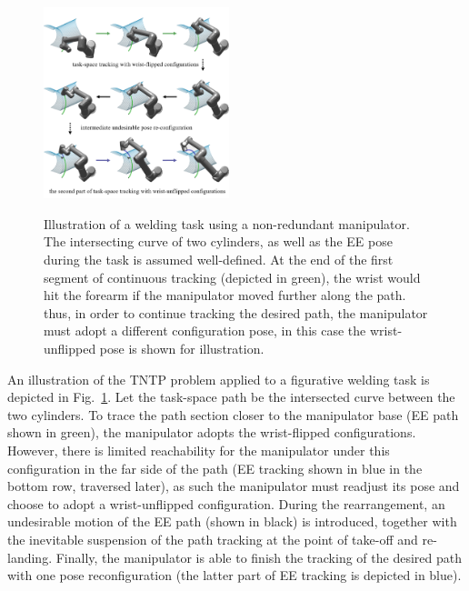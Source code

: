 \documentclass[letterpaper, 10 pt, conference]{ieeeconf}  %
\begin{document}
\begin{figure}[t]
\centering
\includegraphics[width=0.48\textwidth]{figures/fig1/fig1_2}\label{fig:zerosolution}
\caption{Illustration of a welding task using a non-redundant manipulator. The intersecting curve of two cylinders, as well as the EE pose during the task is assumed well-defined. 
At the end of the first segment of continuous tracking (depicted in green), the wrist would hit the forearm if the manipulator moved further along the path. thus, in order to continue tracking the desired path, the manipulator must adopt a different configuration pose, in this case the wrist-unflipped pose is shown for illustration.}
\label{fig:demo1}
\vspace{-0.5cm}
\end{figure}


An illustration of the TNTP problem applied to a figurative welding task is depicted in Fig.~\ref{fig:demo1}. Let the task-space path be the intersected curve between the two cylinders. 
To trace the path section closer to the manipulator base (EE path shown in green), the manipulator adopts the wrist-flipped configurations. 
However, there is limited reachability for the manipulator under this configuration in the far side of the path (EE tracking shown in blue in the bottom row, traversed later), as such the manipulator must readjust its pose and choose to adopt a wrist-unflipped configuration. During the rearrangement, an undesirable motion of the EE path (shown in black) is introduced, together with the inevitable suspension of the path tracking at the point of take-off and re-landing. 
Finally, the manipulator is able to finish the tracking of the desired path with one pose reconfiguration (the latter part of EE tracking is depicted in blue). 
\end{document}
